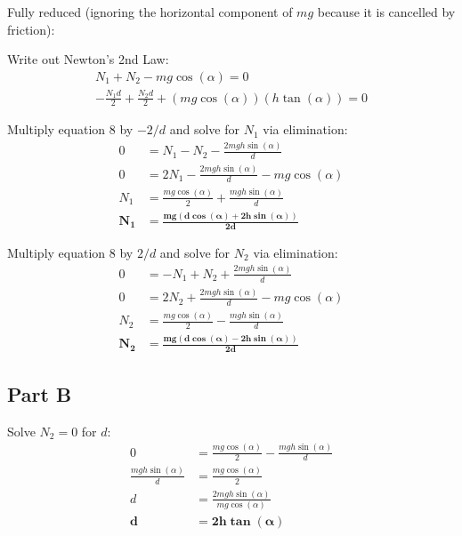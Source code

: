 \documentclass{article}
\begin{document}
Fully reduced (ignoring the horizontal component of $mg$ because it is cancelled
by friction):

\begin{figure}[H]
    \centering
\end{figure}

Write out Newton's 2nd Law:
\begin{gather}
    N_{1}+N_{2}-mg\cos(\alpha)=0\\
    -\frac{N_{1}d}{2}+\frac{N_{2}d}{2}+(mg\cos(\alpha))(h\tan(\alpha))=0
\end{gather}

Multiply equation 8 by $-2/d$ and solve for $N_{1}$ via elimination:
\begin{align*}
    0&=N_{1}-N_{2}-\frac{2mgh\sin(\alpha)}{d}\\
    0&=2N_{1}-\frac{2mgh\sin(\alpha)}{d}-mg\cos(\alpha)\\
    N_{1}&=\frac{mg\cos(\alpha)}{2}+\frac{mgh\sin(\alpha)}{d}\\
    \bm{N_{1}}&\bm{=\frac{mg(d\cos(\alpha)+2h\sin(\alpha))}{2d}}
\end{align*}


Multiply equation 8 by $2/d$ and solve for $N_{2}$ via elimination:
\begin{align*}
    0&=-N_{1}+N_{2}+\frac{2mgh\sin(\alpha)}{d}\\
    0&=2N_{2}+\frac{2mgh\sin(\alpha)}{d}-mg\cos(\alpha)\\
    N_{2}&=\frac{mg\cos(\alpha)}{2}-\frac{mgh\sin(\alpha)}{d}\\
    \bm{N_{2}}&\bm{=\frac{mg(d\cos(\alpha)-2h\sin(\alpha))}{2d}}
\end{align*}

\subsection*{Part B}

Solve $N_{2}=0$ for $d$:
\begin{align*}
    0&=\frac{mg\cos(\alpha)}{2}-\frac{mgh\sin(\alpha)}{d}\\
    \frac{mgh\sin(\alpha)}{d}&=\frac{mg\cos(\alpha)}{2}\\
    d&=\frac{2mgh\sin(\alpha)}{mg\cos(\alpha)}\\
    \bm{d}&\bm{=2h\tan(\alpha)}
\end{align*}
\end{document}
